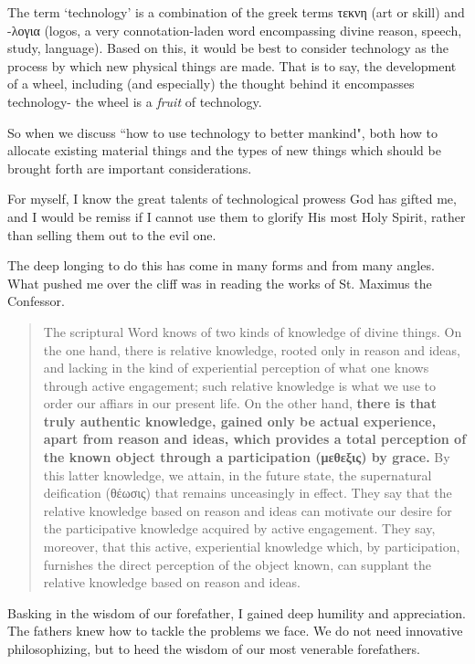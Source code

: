 \documentclass[letterpaper]{article}
\begin{document}
The term `technology' is a combination of the greek terms τεκνη (art or skill) and -λογια (logos, a very connotation-laden word encompassing divine reason, speech, study, language). Based on this, it would be best to consider technology as the process by which new physical things are made. That is to say, the development of a wheel, including (and especially) the thought behind it encompasses technology- the wheel is a \textit{fruit} of technology.

So when we discuss ``how to use technology to better mankind", both how to allocate existing material things and the types of new things which should be brought forth are important considerations. 

For myself, I know the great talents of technological prowess God has gifted me, and I would be remiss if I cannot use them to glorify His most Holy Spirit, rather than selling them out to the evil one.

The deep longing to do this has come in many forms and from many angles. What pushed me over the cliff was in reading the works of St. Maximus the Confessor.

\begin{quote}
  The scriptural Word knows of two kinds of knowledge of divine things. On the one hand, there is relative knowledge, rooted only in reason and ideas, and lacking in the kind of experiential perception of what one knows through active engagement; such relative knowledge is what we use to order our affiars in our present life. On the other hand, \textbf{there is that truly authentic knowledge, gained only be actual experience, apart from reason and ideas, which provides a total perception of the known object through a participation (μεθεξις) by grace.} By this latter knowledge, we attain, in the future state, the supernatural deification (θέωσις) that remains unceasingly in effect. They say that the relative knowledge based on reason and ideas can motivate our desire for the participative knowledge acquired by active engagement. They say, moreover, that this active, experiential knowledge which, by participation, furnishes the direct perception of the object known, can supplant the relative knowledge based on reason and ideas.
\end{quote}

Basking in the wisdom of our forefather, I gained deep humility and appreciation. The fathers knew how to tackle the problems we face. We do not need innovative philosophizing, but to heed the wisdom of our most venerable forefathers.
\end{document}
